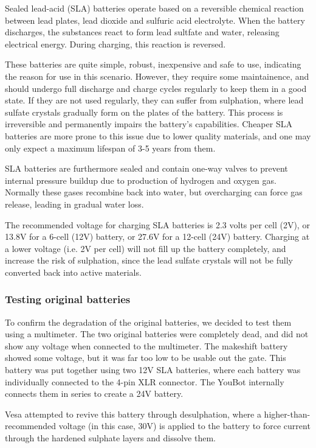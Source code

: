 \documentclass[a4paper, 12pt]{article}
\begin{document}
    Sealed lead-acid (SLA) batteries operate based on a reversible chemical reaction between lead plates, lead dioxide and sulfuric acid electrolyte. When the battery discharges, the substances react to form lead sultfate and water, releasing electrical energy. During charging, this reaction is reversed.

    These batteries are quite simple, robust, inexpensive and safe to use, indicating the reason for use in this scenario. However, they require some maintainence, and should undergo full discharge and charge cycles regularly to keep them in a good state. If they are not used regularly, they can suffer from sulphation, where lead sulfate crystals gradually form on the plates of the battery. This process is irreversible and permanently impairs the battery's capabilities. Cheaper SLA batteries are more prone to this issue due to lower quality materials, and one may only expect a maximum lifespan of 3-5 years from them. 

    SLA batteries are furthermore sealed and contain one-way valves to prevent internal pressure buildup due to production of hydrogen and oxygen gas. Normally these gases recombine back into water, but overcharging can force gas release, leading in gradual water loss. 

    The recommended voltage for charging SLA batteries is 2.3 volts per cell (2V), or 13.8V for a 6-cell (12V) battery, or 27.6V for a 12-cell (24V) battery. Charging at a lower voltage (i.e. 2V per cell) will not fill up the battery completely, and increase the risk of sulphation, since the lead sulfate crystals will not be fully converted back into active materials. 

    \subsubsection{Testing original batteries}

    To confirm the degradation of the original batteries, we decided to test them using a multimeter. The two original batteries were completely dead, and did not show any voltage when connected to the multimeter. The makeshift battery showed some voltage, but it was far too low to be usable out the gate. This battery was put together using two 12V SLA batteries, where each battery was individually connected to the 4-pin XLR connector. The YouBot internally connects them in series to create a 24V battery.   
    
    Vesa attempted to revive this battery through desulphation, where a higher-than-recommended voltage (in this case, 30V) is applied to the battery to force current through the hardened sulphate layers and dissolve them. 
\end{document}
